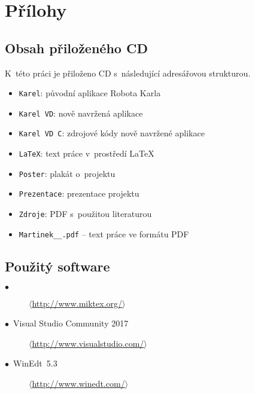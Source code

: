 ﻿\chapter*{Přílohy \label{ch:Apends}}


\section*{Obsah přiloženého CD}

K~této práci je přiloženo CD s~následující adresářovou strukturou.
\begin{itemize}
    \item \texttt{Karel}\?: původní aplikace Robota Karla
    \item \texttt{Karel~VD}\?: nově navržená aplikace
    \item \texttt{Karel~VD C}\?: zdrojové kódy nově navržené aplikace
    \item \texttt{LaTeX}\?: text práce v~prostředí \LaTeX
    \item \texttt{Poster}\?: plakát o~projektu
    \item \texttt{Prezentace}\?: prezentace projektu
    \item \texttt{Zdroje}\?: PDF s~použitou literaturou
    \item \texttt{Martinek\_\the\value{YearOld}\_\Year.pdf} -- text práce ve formátu PDF
\end{itemize}


\section*{Použitý software \label{ch:ApendSW}}

\indent\indent
\begin{minipage}{0.8\linewidth}
\begin{description}
    \item[$\bullet\,\,\,$\LaTeXe]
            \href{http://www.miktex.org/}
            {$\langle$http://www.miktex.org/$\rangle$}
    \item[$\bullet\,\,\,$Visual Studio Community 2017]
            \href{http://www.visualstudio.com/}
            {$\langle$http://www.visualstudio.com/$\rangle$}
    \item[$\bullet\,\,\,$WinEdt~5.3]
            \href{http://www.winedt.com/}
            {$\langle$http://www.winedt.com/$\rangle$}
\end{description}
\end{minipage}
\newline\newline

